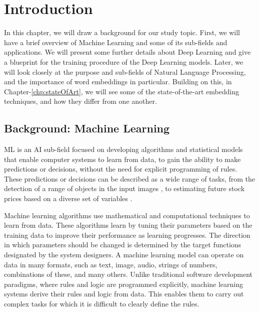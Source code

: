 
\chapter{Introduction}
\label{chp:intro}

In this chapter, we will draw a background for our study topic. First, we will have a brief overview of Machine Learning and some of its sub-fields and applications. We will present some further details about Deep Learning and give a blueprint for the training procedure of the Deep Learning models. Later, we will look closely at the purpose and sub-fields of Natural Language Processing, and the importance of word embeddings in particular. Building on this, in Chapter-\ref{chp:stateOfArt}, we will see some of the state-of-the-art embedding techniques, and how they differ from one another.


\section{Background: Machine Learning}


\ac{ML} is an \ac{AI} sub-field focused on developing algorithms and statistical models that enable computer systems to learn from data, to gain the ability to make predictions or decisions, without the need for explicit programming of rules. These predictions or decisions can be described as a wide range of tasks, from the detection of a range of objects in the input images \cite{maskrcnn}, to estimating future stock prices based on a diverse set of variables \cite{stockmarket}.

Machine learning algorithms use mathematical and computational techniques to learn from data. These algorithms learn by tuning their parameters based on the training data to improve their performance as learning progresses. The direction in which parameters should be changed is determined by the target functions designated by the system designers. A machine learning model can operate on data in many formats, such as text, image, audio, strings of numbers, combinations of these, and many others. Unlike traditional software development paradigms, where rules and logic are programmed explicitly, machine learning systems derive their rules and logic from data. This enables them to carry out complex tasks for which it is difficult to clearly define the rules.


